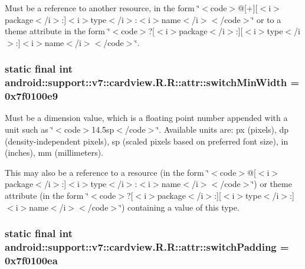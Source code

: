 Must be a reference to another resource, in the form \char`\"{}$<$code$>$@\mbox{[}+\mbox{]}\mbox{[}$<$i$>$package$<$/i$>$:\mbox{]}$<$i$>$type$<$/i$>$:$<$i$>$name$<$/i$>$$<$/code$>$\char`\"{} or to a theme attribute in the form \char`\"{}$<$code$>$?\mbox{[}$<$i$>$package$<$/i$>$:\mbox{]}\mbox{[}$<$i$>$type$<$/i$>$:\mbox{]}$<$i$>$name$<$/i$>$$<$/code$>$\char`\"{}. \hypertarget{classandroid_1_1support_1_1v7_1_1cardview_1_1_r_1_1attr_f0583dcaaea042255a908fff19dee1be}{
\subsubsection[{switchMinWidth}]{\setlength{\rightskip}{0pt plus 5cm}static final int android::support::v7::cardview.R.R::attr::switchMinWidth = 0x7f0100e9}}
\label{classandroid_1_1support_1_1v7_1_1cardview_1_1_r_1_1attr_f0583dcaaea042255a908fff19dee1be}


Must be a dimension value, which is a floating point number appended with a unit such as \char`\"{}$<$code$>$14.5sp$<$/code$>$\char`\"{}. Available units are: px (pixels), dp (density-independent pixels), sp (scaled pixels based on preferred font size), in (inches), mm (millimeters). 

This may also be a reference to a resource (in the form \char`\"{}$<$code$>$@\mbox{[}$<$i$>$package$<$/i$>$:\mbox{]}$<$i$>$type$<$/i$>$:$<$i$>$name$<$/i$>$$<$/code$>$\char`\"{}) or theme attribute (in the form \char`\"{}$<$code$>$?\mbox{[}$<$i$>$package$<$/i$>$:\mbox{]}\mbox{[}$<$i$>$type$<$/i$>$:\mbox{]}$<$i$>$name$<$/i$>$$<$/code$>$\char`\"{}) containing a value of this type. \hypertarget{classandroid_1_1support_1_1v7_1_1cardview_1_1_r_1_1attr_756405197104a3a45c01ad111b9ac5b8}{
\subsubsection[{switchPadding}]{\setlength{\rightskip}{0pt plus 5cm}static final int android::support::v7::cardview.R.R::attr::switchPadding = 0x7f0100ea}}
\label{classandroid_1_1support_1_1v7_1_1cardview_1_1_r_1_1attr_756405197104a3a45c01ad111b9ac5b8}


